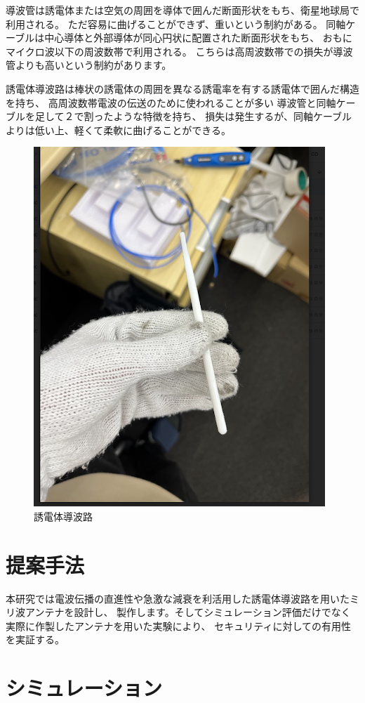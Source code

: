 \documentclass[technicalreport]{ieicej}
\begin{document}
導波管は誘電体または空気の周囲を導体で囲んだ断面形状をもち、衛星地球局で利用される。
ただ容易に曲げることができず、重いという制約がある。
同軸ケーブルは中心導体と外部導体が同心円状に配置された断面形状をもち、
おもにマイクロ波以下の周波数帯で利用される。
こちらは高周波数帯での損失が導波管よりも高いという制約があります。

誘電体導波路は棒状の誘電体の周囲を異なる誘電率を有する誘電体で囲んだ構造を持ち、
高周波数帯電波の伝送のために使われることが多い
導波管と同軸ケーブルを足して２で割ったような特徴を持ち、
損失は発生するが、同軸ケーブルよりは低い上、軽くて柔軟に曲げることができる。

\begin{figure}
  \begin{center}    
    \includegraphics[clip, keepaspectratio, width=0.5\linewidth]{img/waveguide.png}
    \caption{誘電体導波路}
    \label{fig:metal_waveguide}
  \end{center}
\end{figure}

\section{提案手法}

本研究では電波伝播の直進性や急激な減衰を利活用した誘電体導波路を用いたミリ波アンテナを設計し、
製作します。そしてシミュレーション評価だけでなく実際に作製したアンテナを用いた実験により、
セキュリティに対しての有用性を実証する。

\subsection{}

\section{シミュレーション}
\end{document}
